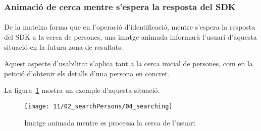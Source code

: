 \subsubsection{Animació de cerca mentre s'espera la resposta del SDK}

\paragraph{}
De la mateixa forma que en l'operació d'identificació, mentre s'espera la resposta del SDK a la cerca de persones, una imatge animada informarà l'usuari d'aquesta situació en la futura zona de resultats.

Aquest aspecte d'usabilitat s'aplica tant a la cerca inicial de persones, com en la petició d’obtenir els detalls d’una persona en concret.

La figura~\ref{fig:pSearchLoading} mostra un exemple d'aquesta situació.

\begin{figure}[h]
    \texttt{[image: 11/02\_searchPersons/04\_searching]}
    \centering
    \caption{Imatge animada mentre es processa la cerca de l'usuari}\label{fig:pSearchLoading}
\end{figure}
